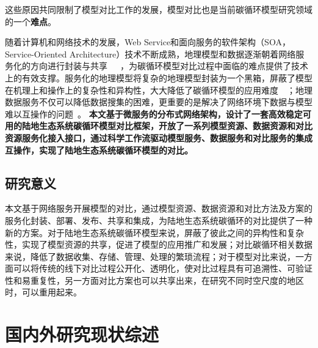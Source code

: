 这些原因共同限制了模型对比工作的发展，模型对比也是当前碳循环模型研究领域的一个\textbf{难点}。

随着计算机和网络技术的发展，Web Service和面向服务的软件架构（SOA，Service-Oriented Architecture）技术不断成熟，地理模型和数据逐渐朝着网络服务化的方向进行封装与共享~\cite{adgeo-4-69-2005}~\cite{peckham2009componentizing}~\cite{胡迪2015地理模型的服务化封装方法研究}，为碳循环模型对比过程中面临的难点提供了技术上的有效支撑。服务化的地理模型将复杂的地理模型封装为一个黑箱，屏蔽了模型在机理上和操作上的复杂性和异构性，大大降低了碳循环模型的应用难度~\cite{胡迪2015地理模型的服务化封装方法研究}~\cite{yue2016service}；地理数据服务不仅可以降低数据搜集的困难，更重要的是解决了网络环境下数据与模型难以互操作的问题~\cite{Yue2015A}。
\textbf{本文基于微服务的分布式网络架构，设计了一套高效稳定可用的陆地生态系统碳循环模型对比框架，开放了一系列模型资源、数据资源和对比资源服务化接入接口，通过科学工作流驱动模型服务、数据服务和对比服务的集成互操作，实现了陆地生态系统碳循环模型的对比。}

\subsection{研究意义}

本文基于网络服务开展模型的对比，通过模型资源、数据资源和对比方法及方案的服务化封装、部署、发布、共享和集成，为陆地生态系统碳循环的对比提供了一种新的方案。对于陆地生态系统碳循环模型来说，屏蔽了彼此之间的异构性和复杂性，实现了模型资源的共享，促进了模型的应用推广和发展；对比碳循环相关数据来说，降低了数据收集、存储、管理、处理的繁琐流程；对于模型对比来说，一方面可以将传统的线下对比过程公开化、透明化，使对比过程具有可追溯性、可验证性和易重复性，另一方面对比方案也可以共享出来，在研究不同时空尺度的地区时，可以重用起来。

\section{国内外研究现状综述}

